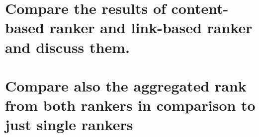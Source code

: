 \documentclass[article,10pt]{article}
\begin{document}
\section{Compare the results of content-based ranker and link-based ranker and discuss them.}



\section{Compare also the aggregated rank from both rankers in comparison to just single rankers}



\end{document}
